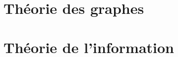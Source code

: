 \begin{comment}
\end{comment}

\appendix
\renewcommand\chapterstring{Annexe}

\chapter{Théorie des graphes}

\chapter{Théorie de l'information}


